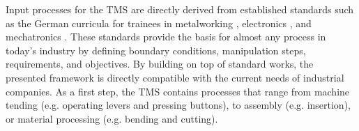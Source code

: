 Input processes for the TMS are directly derived from established standards such as the German curricula for trainees in metalworking \cite{Burmester.2020}, electronics \cite{Bumiller.2021}, and mechatronics \cite{Hebel.2020}.
These standards provide the basis for almost any process in today's industry by defining boundary conditions, manipulation steps, requirements, and objectives.
By building on top of standard works, the presented framework is directly compatible with the current needs of industrial companies.
As a first step, the TMS contains processes that range from machine tending (e.g. operating levers and pressing buttons), to assembly (e.g. insertion), or material processing (e.g. bending and cutting).